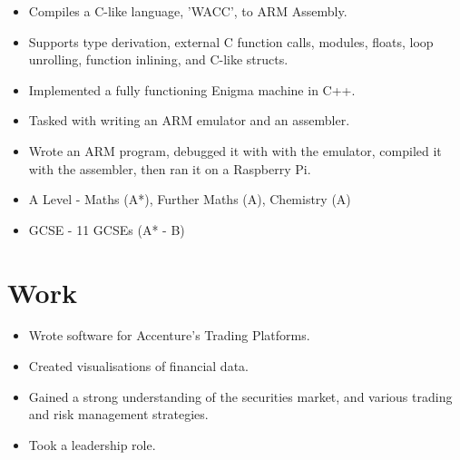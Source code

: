 \documentclass{jcgcv}
\begin{document}
\begin{column}
\begin{adjustwidth}{0.3cm}{}
\begin{itemize}
  \item Compiles a C-like language, 'WACC', to ARM Assembly.
  \item Supports type derivation, external C function calls, modules, floats, loop unrolling, function inlining, and C-like structs.
\end{itemize}

\begin{itemize}
  \item Implemented a fully functioning Enigma machine in C++.
\end{itemize}

\begin{itemize}
  \item Tasked with writing an ARM emulator and an assembler.
  \item Wrote an ARM program, debugged it with with the emulator, compiled it with the assembler, then ran it on a Raspberry Pi.
\end{itemize}

\end{adjustwidth}

\vspace{10pt}

\begin{itemize}
  \item A Level - Maths (A*), Further Maths (A), Chemistry (A)
  \item GCSE - 11 GCSEs (A* - B)
\end{itemize}



\section{Work}

\begin{itemize}
  \item Wrote software for Accenture's Trading Platforms.
  \item Created visualisations of financial data.
  \item Gained a strong understanding of the securities market, and various trading and risk management strategies.
  \item Took a leadership role.
\end{itemize}


\end{column}
\end{document}

